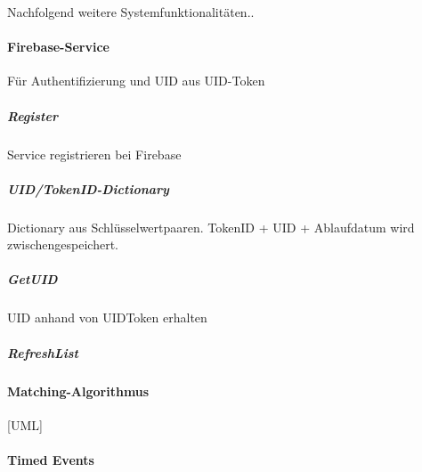                  
Nachfolgend weitere Systemfunktionalitäten..

\paragraph{Firebase-Service}
Für Authentifizierung und UID aus UID-Token

\subparagraph{Register}
Service registrieren bei Firebase

\subparagraph{UID/TokenID-Dictionary}
Dictionary aus Schlüsselwertpaaren. TokenID + UID + Ablaufdatum wird zwischengespeichert.

\subparagraph{GetUID}
UID anhand von UIDToken erhalten

\subparagraph{RefreshList}

\paragraph{Matching-Algorithmus}

[UML]

\paragraph{Timed Events}